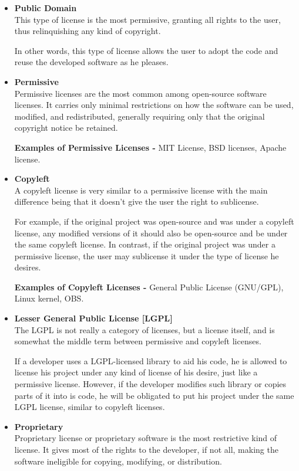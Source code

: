 \begin{itemize}

  \item \textbf{Public Domain}  \\
  This type of license is the most permissive, granting all rights to the user, thus relinquishing any kind of copyright. 

  In other words, this type of license allows the user to adopt the code and reuse the developed software as he pleases.
 
  
  \item \textbf{Permissive} \\
  Permissive licenses are the most common among open-source software licenses. It carries only minimal restrictions on how the software can be used, modified, and redistributed, generally requiring only that the original copyright notice be retained.

  \textbf{Examples of Permissive Licenses -} MIT License, BSD licenses, Apache license.
  
  \item \textbf{Copyleft} \\
  A copyleft license is very similar to a permissive license with the main difference being that it doesn't give the user the right to sublicense. 

  For example, if the original project was open-source and was under a copyleft license, any modified versions of it should also be open-source and be under the same copyleft license. In contrast, if the original project was under a permissive license, the user may sublicense it under the type of license he desires.

  \textbf{Examples of Copyleft Licenses -} General Public License (GNU/GPL), Linux kernel, OBS.
  
    
  \item \textbf{Lesser General Public License [LGPL]} \\
  The LGPL is not really a category of licenses, but a license itself, and is somewhat the middle term between permissive and copyleft licenses.

  If a developer uses a LGPL-licensed library to aid his code, he is allowed to license his project under any kind of license of his desire, just like a permissive license. However, if the developer modifies such library or copies parts of it into is code, he will be obligated to put his project under the same LGPL license, similar to copyleft licenses.
  
  
  \item \textbf{Proprietary}\\
  Proprietary license or proprietary software is the most restrictive kind of license. It gives most of the rights to the developer, if not all, making the software ineligible for copying, modifying, or distribution.

\end{itemize}



